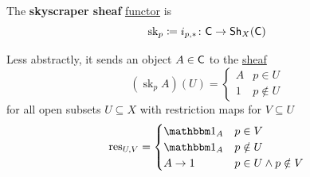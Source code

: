 \documentclass[../../main]{subfiles}
\begin{document}
\begin{definition}\label{def:skyscraper-sheaf}
  The \textbf{skyscraper sheaf} \hyperref[def:functor]{functor} is
  \begin{equation*}
    \operatorname{sk}_{p} \coloneq i_{p, \ast}\colon \mathsf{C} \to \mathsf{Sh}_{X}(\mathsf{C})
  \end{equation*}

  Less abstractly, it sends an object \(A \in \mathsf{C}\) to the \hyperref[def:sheaf]{sheaf}
  \begin{equation*}
    (\operatorname{sk}_{p}A)(U) = \begin{cases}
      A & p \in U \\
      1 & p \notin U
    \end{cases}
  \end{equation*}
  for all open subsets \(U \subseteq X\) with restriction maps for \(V \subseteq U\)
  \begin{equation*}
    \res_{U, V} = \begin{cases}
      \id_{A} & p \in V \\
      \id_{A} & p \notin U \\
      A \to 1 & p \in U \land p \notin V
    \end{cases}
  \end{equation*}
\end{definition}
\end{document}
